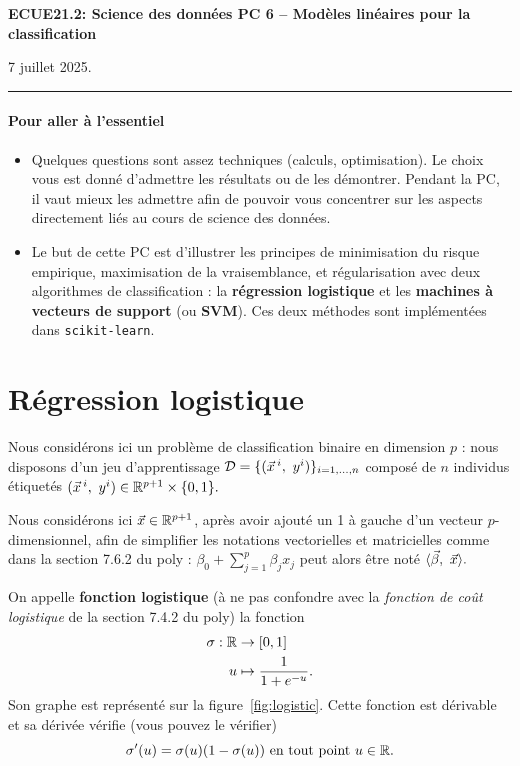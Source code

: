 \documentclass[french,11pt]{article}
\begin{document}
\begin{center}
\bf\large ECUE21.2: Science des données \hfill
PC 6 -- Modèles linéaires pour la classification
\end{center}

\noindent
\hfill 7 juillet 2025.

\noindent
\rule{\textwidth}{.4pt}

\medskip

\paragraph{Pour aller à l'essentiel}
\begin{itemize}
\item Quelques questions sont assez techniques (calculs, optimisation). Le
  choix vous est donné d'admettre les résultats ou de les démontrer. Pendant la
  PC, il vaut mieux les admettre afin de pouvoir vous concentrer sur
  les aspects directement liés au cours de science des données.
\item Le but de cette PC est d'illustrer les principes de minimisation du risque empirique, maximisation de la vraisemblance, et régularisation avec deux algorithmes de classification : la \textbf{régression logistique} et les \textbf{machines à vecteurs de support} (ou \textbf{SVM}). Ces deux méthodes sont implémentées dans \texttt{scikit-learn}.
\end{itemize}

\section{Régression logistique}
Nous considérons ici un problème de classification binaire en
dimension $p$ : nous disposons d'un jeu d'apprentissage
$\DD = \{(\xx^i,~y^i)\}_{i=1, \dots, n}$ composé de $n$ individus étiquetés
$(\xx^i,~y^i) \in \RR^{p+1} \times \{0, 1\}.$

Nous considérons ici $\xx \in \RR^{p+1}$, après avoir ajouté un 1 à gauche d'un
vecteur $p$-dimensionnel, afin de simplifier les notations vectorielles et
matricielles comme dans la section 7.6.2 du poly :
$\beta_0 + \sum_{j=1}^p \beta_j x_j$ peut alors être noté
$\innerproduct{\bbeta,~\xx}.$ 

On appelle \textbf{fonction logistique} (à ne pas confondre avec la
\textit{fonction de coût logistique} de la section 7.4.2 du poly) la fonction
\begin{align*}
  \sigma: \mathbb{R} & \rightarrow [0, 1]\\
  u & \mapsto \frac{1}{1+e^{-u}}. 
\end{align*}
Son graphe est représenté sur la figure~\ref{fig:logistic}. Cette fonction est
dérivable et sa dérivée vérifie (vous pouvez le vérifier)
\begin{equation}
  \sigma^\prime(u) = \sigma(u) (1-\sigma(u)) \text{ en tout point } u \in \mathbb{R}.
  \label{eq:sigma_prime}
\end{equation}
\end{document}
